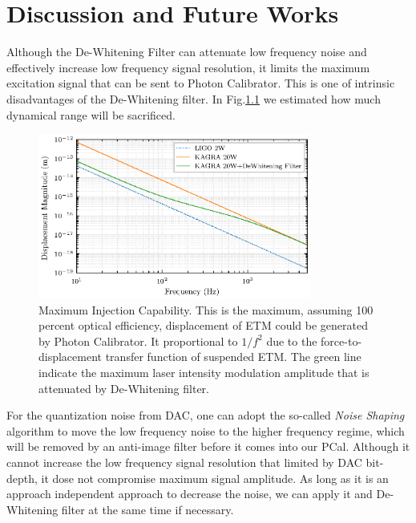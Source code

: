 




\chapter{Discussion and Future Works}

Although the De-Whitening Filter can attenuate low frequency noise and effectively increase low frequency signal resolution, it limits the maximum excitation signal that can be sent to Photon Calibrator. This is one of intrinsic disadvantages of the De-Whitening filter. In Fig.\ref{fig:injcap} we estimated how much dynamical range will be sacrificed. 

\begin{figure}[hbt!]
\centering
\includegraphics[width=0.8\textwidth]{figure/20WdeW}
\caption[Maximum Injection Capability]{Maximum Injection Capability. This is the maximum, assuming 100 percent optical efficiency, displacement of ETM could be generated by Photon Calibrator. It proportional to $1/f^2$ due to the force-to-displacement transfer function of suspended ETM. The green line indicate the maximum laser intensity modulation amplitude that is attenuated by De-Whitening filter.}
\label{fig:injcap}

\end{figure}

For the quantization noise from DAC, one can adopt the so-called \emph{Noise Shaping} algorithm \cite{dac:shaping} to move the low frequency noise to the higher frequency regime, which will be removed by an anti-image filter before it comes into our PCal. Although it cannot increase the low frequency signal resolution that limited by DAC bit-depth, it dose not compromise maximum signal amplitude. As long as it is an approach independent approach to decrease the noise, we can apply it and De-Whitening filter at the same time if necessary.

